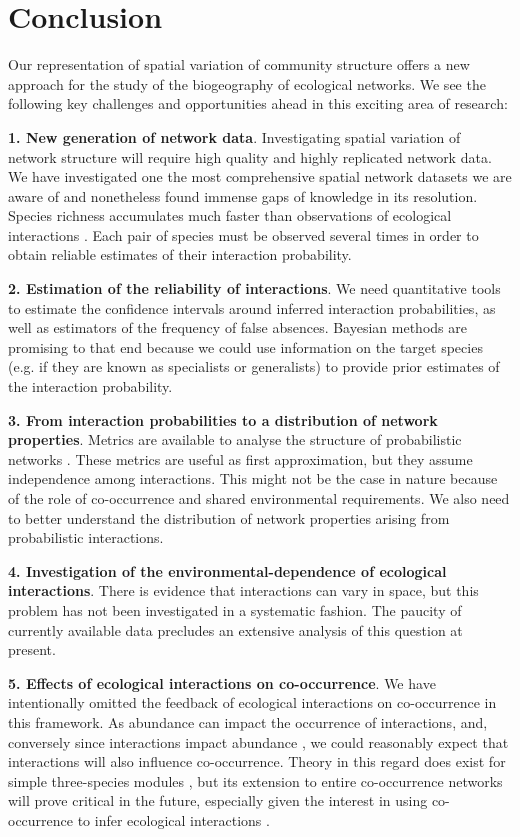 \documentclass[12pt]{article}
\begin{document}
\section*{Conclusion}

Our representation of spatial variation of community structure offers a new
approach for the study of the biogeography of ecological networks. We see the
following key challenges and opportunities ahead in this exciting area of
research:

\textbf{1. New generation of network data}. Investigating spatial
variation of network structure will require high quality and highly replicated
network data. We have investigated one the most comprehensive spatial network
datasets we are aware of and nonetheless found immense gaps of knowledge in its
resolution. Species richness accumulates much faster than observations of
ecological interactions \citep{Poisot2012}. Each pair of species must be
observed several times in order to obtain reliable estimates of their interaction
probability.

\textbf{2. Estimation of the reliability of interactions}. We need
quantitative tools to estimate the confidence intervals around inferred
interaction probabilities, as well as estimators of the frequency of false
absences. Bayesian methods are promising to that end because we could use
information on the target species (e.g. if they are known as specialists or
generalists) to provide prior estimates of the interaction probability.

\textbf{3. From interaction probabilities to a distribution of network
properties}. Metrics are available to analyse the structure of probabilistic
networks \citep{Poisot2015c}. These metrics are useful as first approximation,
but they assume independence among interactions. This might not be the case in
nature because of the role of co-occurrence and shared environmental
requirements. We also need to better understand the distribution of network
properties arising from probabilistic interactions.

\textbf{4. Investigation of the environmental-dependence of ecological
interactions}. There is evidence that interactions can vary in space, but this
problem has not been investigated in a systematic fashion. The paucity of
currently available data precludes an extensive analysis of this question at
present.

\textbf{5. Effects of ecological interactions on co-occurrence}. We have
intentionally omitted the feedback of ecological interactions on co-occurrence
in this framework. As abundance can impact the occurrence of interactions, and,
conversely since interactions impact abundance \citep{Canard2014}, we could
reasonably expect that interactions will also influence co-occurrence. Theory
in this regard does exist for simple three-species modules
\citep{Cazelles2015}, but its extension to entire co-occurrence networks will
prove critical in the future, especially given the interest in using co-
occurrence to infer ecological interactions \citep{Morales-Castilla2015,
Morueta-Holme2016}.
\end{document}

